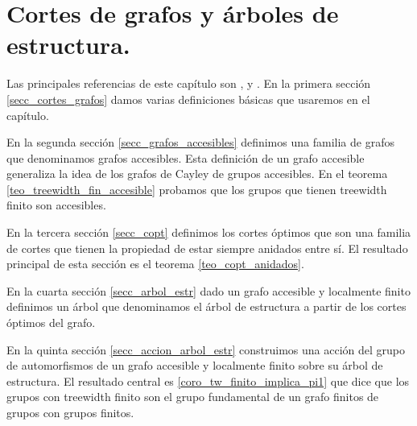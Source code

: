 \documentclass[tesis.tex]{subfiles}
\begin{document}
	
\chapter{Cortes de grafos y árboles de estructura.}

Las principales referencias de este capítulo son \cite{diekert2013context}, \cite{thomassen1993vertex} y \cite{kron2010cutting}.
En la primera sección \ref{secc_cortes_grafos} damos varias definiciones básicas que usaremos en el capítulo. 

En la segunda sección \ref{secc_grafos_accesibles} definimos una familia de grafos que denominamos grafos accesibles.
Esta definición de un grafo accesible generaliza la idea de los grafos de Cayley de grupos accesibles.
En el teorema \ref{teo_treewidth_fin_accesible} probamos que los grupos que tienen treewidth finito son accesibles. 

En la tercera sección \ref{secc_copt} definimos los cortes óptimos que son una familia de cortes que tienen la propiedad de estar siempre anidados entre sí.
El resultado principal de esta sección es el teorema \ref{teo_copt_anidados}.

En la cuarta sección \ref{secc_arbol_estr} dado un grafo accesible y localmente finito definimos un árbol que denominamos el árbol de estructura a partir de los cortes óptimos del grafo.

En la quinta sección \ref{secc_accion_arbol_estr} construimos una acción del grupo de automorfismos de un grafo accesible y localmente finito sobre su árbol de estructura.
El resultado central es \ref{coro_tw_finito_implica_pi1} que dice que los grupos con treewidth finito son el grupo fundamental de un grafo finitos de grupos con grupos finitos.



%
\end{document}
